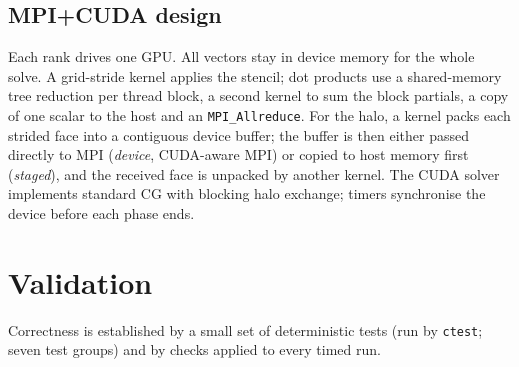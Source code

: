 \documentclass[11pt,a4paper]{article}
\begin{document}
\subsection{MPI+CUDA design}\label{sec:cuda}
Each rank drives one GPU. All vectors stay in device memory for the whole solve. A grid-stride
kernel applies the stencil; dot products use a shared-memory tree reduction per thread block, a
second kernel to sum the block partials, a copy of one scalar to the host and an
\texttt{MPI\_Allreduce}. For the halo, a kernel packs each strided face into a contiguous device
buffer; the buffer is then either passed directly to MPI (\emph{device}, CUDA-aware MPI) or
copied to host memory first (\emph{staged}), and the received face is unpacked by another kernel.
The CUDA solver implements standard CG with blocking halo exchange; timers synchronise the
device before each phase ends.

\section{Validation}\label{sec:validation}
Correctness is established by a small set of deterministic tests (run by \texttt{ctest}; seven
test groups) and by checks applied to every timed run.
\end{document}
